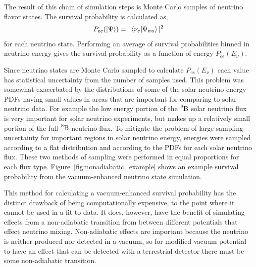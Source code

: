 The result of this chain of simulation steps is Monte Carlo samples
of neutrino flavor states. The survival probability is calculated as,
\begin{equation}
P_{ee}(\ket{\Psi}) = |\braket{\nu_{e}}{\Psi_{nu}}|^2
\end{equation}
for each neutrino state.
Performing an average of survival probabilities binned in neutrino energy 
gives the survival probability as a function of energy $P_{ee}(E_{\nu})$.

Since neutrino states are Monte Carlo sampled to calculate $P_{ee}(E_{\nu})$
each value has statistical uncertainty from the number of samples used.
This problem was somewhat exacerbated by the distributions of some of the
solar neutrino energy PDFs having small values in areas that are important for
comparing to solar neutrino data. For example the low energy portion of the
$\ce{^{8}B}$ solar neutrino flux is very important for solar neutrino experiments,
but makes up a relatively small portion of the full $\ce{^{8}B}$ neutrino flux.
To mitigate the problem of large sampling uncertainty for important regions in
solar neutrino energy, energies were sampled according to a flat distribution
and according to the PDFs for each solar neutrino flux. These two methods of sampling
were performed in equal proportions for each flux type.
Figure~\ref{fig:nonadiabatic_example} shows an example survival probability
from the vacuum-enhanced neutrino state simulation.

This method for calculating a vacuum-enhanced survival probability has the
distinct drawback of being computationally expensive, to the point
where it cannot be used in a fit to data.
It does, however, have the benefit of simulating effects from a non-adiabatic
transition from between different potentials that effect neutrino mixing.
Non-adiabatic effects are important because the neutrino is neither produced nor
detected in a vacuum, so for modified vacuum potential to have an effect
that can be detected with a terrestrial detector there must be some
non-adiabatic transition.

